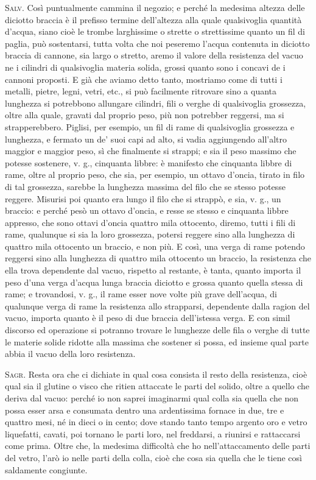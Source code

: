 \documentclass[11pt,twoside,openany]{book}
\newcommand{\speaker}[1]{\textcolor{rubric}{\textsc{#1}}\space}
\begin{document}
\speaker{Salv.} Così puntualmente cammina il negozio; e perché la medesima altezza delle diciotto braccia è il prefisso termine dell'altezza alla quale qualsivoglia quantità d'acqua, siano cioè le trombe larghissime o strette o strettissime quanto un fil di paglia, può sostentarsi, tutta volta che noi peseremo l'acqua contenuta in diciotto braccia di cannone, sia largo o stretto, aremo il valore della resistenza del vacuo ne i cilindri di qualsivoglia materia solida, grossi quanto sono i concavi de i cannoni proposti. E già che aviamo detto tanto, mostriamo come di tutti i metalli, pietre, legni, vetri, etc., si può facilmente ritrovare sino a quanta lunghezza si potrebbono allungare cilindri, fili o verghe di qualsivoglia grossezza, oltre alla quale, gravati dal proprio peso, più non potrebber reggersi, ma si strapperebbero. Piglisi, per esempio, un fil di rame di qualsivoglia grossezza e lunghezza, e fermato un de' suoi capi ad alto, si vadia aggiungendo all'altro maggior e maggior peso, sì che finalmente si strappi; e sia il peso massimo che potesse sostenere, v. g., cinquanta libbre: è manifesto che cinquanta libbre di rame, oltre al proprio peso, che sia, per esempio, un ottavo d'oncia, tirato in filo di tal grossezza, sarebbe la lunghezza massima del filo che se stesso potesse reggere. Misurisi poi quanto era lungo il filo che si strappò, e sia, v. g., un braccio: e perché pesò un ottavo d'oncia, e resse se stesso e cinquanta libbre appresso, che sono ottavi d'oncia quattro mila ottocento, diremo, tutti i fili di rame, qualunque si sia la loro grossezza, potersi reggere sino alla lunghezza di quattro mila ottocento un braccio, e non più. E così, una verga di rame potendo reggersi sino alla lunghezza di quattro mila ottocento un braccio, la resistenza che ella trova dependente dal vacuo, rispetto al restante, è tanta, quanto importa il peso d'una verga d'acqua lunga braccia diciotto e grossa quanto quella stessa di rame; e trovandosi, v. g., il rame esser nove volte più grave dell'acqua, di qualunque verga di rame la resistenza allo strapparsi, dependente dalla ragion del vacuo, importa quanto è il peso di due braccia dell'istessa verga. E con simil discorso ed operazione si potranno trovare le lunghezze delle fila o verghe di tutte le materie solide ridotte alla massima che sostener si possa, ed insieme qual parte abbia il vacuo della loro resistenza.

\speaker{Sagr.} Resta ora che ci dichiate in qual cosa consista il resto della resistenza, cioè qual sia il glutine o visco che ritien attaccate le parti del solido, oltre a quello che deriva dal vacuo: perché io non saprei imaginarmi qual colla sia quella che non possa esser arsa e consumata dentro una ardentissima fornace in due, tre e quattro mesi, né in dieci o in cento; dove stando tanto tempo argento oro e vetro liquefatti, cavati, poi tornano le parti loro, nel freddarsi, a riunirsi e rattaccarsi come prima. Oltre che, la medesima difficoltà che ho nell'attaccamento delle parti del vetro, l'arò io nelle parti della colla, cioè che cosa sia quella che le tiene così saldamente congiunte.
\end{document}
